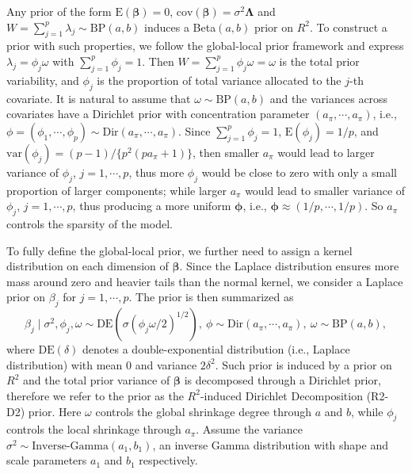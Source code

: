 \documentclass[12pt]{article}
\newcommand{\Lambdabf}{{\mathbf \Lambda}}
\begin{document}
Any prior of the form  $\text{E}(\bm \beta) = 0$, $\text{cov}( \bm\beta) =  \sigma^2\Lambdabf$ and $ W = \sum_{j=1}^p \lambda_j \sim \text{BP}(a,b)$ induces a Beta$(a,b)$ prior on $R^2$.  To construct a prior with such properties,   we follow the global-local prior framework and express $\lambda_j =  \phi_j\omega$  with  $\sum_{j=1}^p \phi_j = 1$.  Then $W = \sum_{j=1}^p    \phi_j\omega= \omega$ is the total prior variability, and $\phi_j$ is the proportion of total variance allocated to the $j$-th covariate. It is natural to assume that  $\omega\sim\text{BP}(a,b)$ and the  variances across covariates have a Dirichlet prior with concentration parameter  $(a_\pi,\cdots,a_\pi)$, i.e.,  $ {\phi} = (\phi_1,\cdots, \phi_p)\sim\text{Dir}(a_\pi,\cdots,a_\pi)$.
%
Since
$\sum_{j=1}^p\phi_j = 1$,
$
\text{E} (\phi_j) = 1/p$, and $ \text{var}(\phi_j) = (p-1)/\{p^2(pa_\pi+1)\}$,
then smaller $a_\pi$ would lead to  larger variance of ${\phi}_j$,  $j=1,\cdots,p$, thus more  ${\phi}_j $ would be  close to zero with  only a small proportion  of larger components;
while larger $a_\pi$  would lead to smaller variance of  ${\phi}_j$,  $j=1,\cdots,p$, thus producing a  more
uniform $\bm{\phi}$, i.e., $\bm{\phi} \approx (1/p, \cdots, 1/p)$. So $a_\pi$ controls the sparsity of the model.


To fully define the global-local prior, we   further  need to  assign a kernel   distribution
on  each dimension of $ \bm{\beta}$.
Since the Laplace  distribution ensures more mass around zero and heavier tails than the normal kernel,   we consider a Laplace prior on $\beta_j$ for $j=1,\cdots,p$.
%
The prior is then  summarized as
\begin{equation}\label{eq_R2-D2 prior_dirichlet BP form}
\beta_j  \mid \sigma^2,   \phi_j, \omega \sim \text{DE}( \sigma (\phi_j \omega/2)^{1/2} ), \
{\phi} \sim \text{Dir}(a_\pi,\cdots,a_\pi), \
\omega \sim \text{BP}(a,b),
\end{equation}
where
$\text{DE}(\delta)$  denotes  a double-exponential distribution (i.e., Laplace distribution) with mean $0$ and   variance $2\delta^2$.
Such prior is induced by a  prior on $R^2$   and the total prior  variance of  $ \bm{\beta}$ is
decomposed through a Dirichlet prior,
therefore we refer to the prior as  the  $R^2$-induced Dirichlet Decomposition (R2-D2) prior.
Here $\omega$ controls the global shrinkage degree through $a$ and $b$,
while $\phi_j$ controls the local shrinkage through $a_\pi$.  Assume the variance $\sigma^2\sim \text{Inverse-Gamma} (a_1,b_1)$,  an inverse Gamma distribution with shape and scale parameters $a_1$ and $b_1$ respectively.
\end{document}
